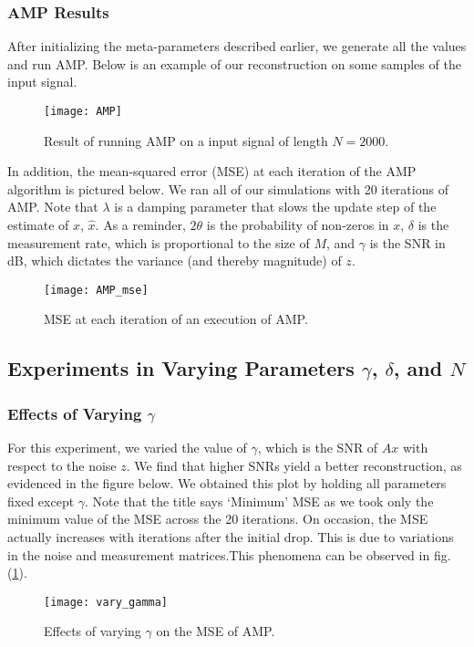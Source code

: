 \documentclass[]{../../ncmathy}
\begin{document}
	\subsubsection{AMP Results}
		After initializing the meta-parameters described earlier, we generate all the values and run AMP. Below is an example of our reconstruction on some samples of the input signal.
		
		\begin{figure}[H]
		\centering\texttt{[image: AMP]}
		\caption{Result of running AMP on a input signal of length $N=2000$.}
		\end{figure}

		In addition, the mean-squared error (MSE) at each iteration of the AMP algorithm is pictured below. We ran all of our simulations with 20 iterations of AMP. Note that $\lambda$ is a damping parameter that slows the update step of the estimate of $x$, $\hat{x}$. As a reminder, $2\theta$ is the probability of non-zeros in $x$, $\delta$ is the measurement rate, which is proportional to the size of $M$, and $\gamma$ is the SNR in dB, which dictates the variance (and thereby magnitude) of $z$. 
		
		\begin{figure}[H]
		\centering\texttt{[image: AMP\_mse]}
		\caption{MSE at each iteration of an execution of AMP.}
		\label{incmse}
		\end{figure}	
	
\subsection{Experiments in Varying Parameters $\gamma$, $\delta$, and $N$}
	\subsubsection{Effects of Varying $\gamma$}
			For this experiment, we varied the value of $\gamma$, which is the SNR of $Ax$ with respect to the noise $z$. We find that higher SNRs yield a better reconstruction, as evidenced in the figure below. We obtained this plot by holding all parameters fixed except $\gamma$. Note that the title says `Minimum' MSE as we took only the minimum value of the MSE across the 20 iterations. On occasion, the MSE actually increases with iterations after the initial drop. This is due to variations in the noise and measurement matrices.This phenomena can be observed in fig. (\ref{incmse}).
		
		\begin{figure}[H]
		\centering\texttt{[image: vary\_gamma]}
		\caption{Effects of varying $\gamma$ on the MSE of AMP.}
		\end{figure}
	
\end{document}
